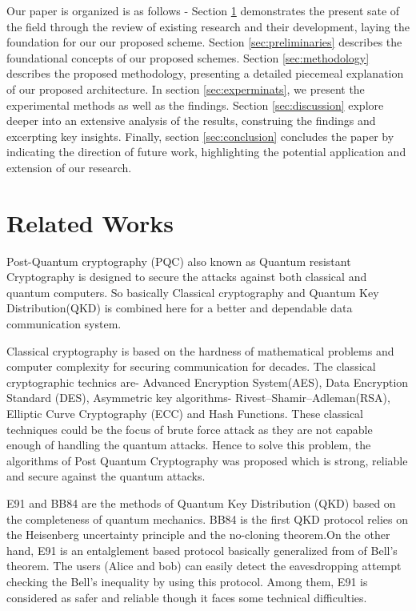 \documentclass{article}
\begin{document}
Our paper is organized is as follows - Section \ref{sec:relatedWorks} demonstrates the present sate of the field through the review of existing research and their development, laying the foundation for our our proposed scheme. Section \ref{sec:preliminaries} describes the foundational concepts of our proposed schemes. Section \ref{sec:methodology} describes the proposed methodology, presenting a detailed piecemeal explanation of our proposed architecture. In section \ref{sec:experminats}, we present the experimental methods as well as the findings. Section \ref{sec:discussion} explore deeper into an extensive analysis of the results, construing the findings and excerpting key insights. Finally, section \ref{sec:conclusion} concludes the paper by indicating the direction of future work, highlighting the potential application and extension of our research.
\section{Related Works}
\label{sec:relatedWorks}
Post-Quantum cryptography (PQC) also known as Quantum resistant Cryptography is designed to secure the attacks against both classical and quantum computers. So basically Classical cryptography and Quantum Key Distribution(QKD) is combined here for a better and dependable data communication system.

Classical cryptography is based on the hardness of mathematical problems and computer complexity for securing communication for decades. The classical cryptographic technics are- Advanced Encryption System(AES), Data Encryption Standard (DES), Asymmetric key algorithms- Rivest–Shamir–Adleman(RSA), Elliptic Curve Cryptography (ECC) and Hash Functions. These classical techniques could be the focus of brute force attack as they are not capable enough of handling the quantum attacks. Hence to solve this problem, the algorithms of Post Quantum Cryptography was proposed which is strong, reliable and secure against the quantum attacks.\cite{sharma2023post}

E91 and BB84 are the methods of Quantum Key Distribution (QKD) based on the completeness of quantum mechanics. BB84 is the first QKD protocol relies on the Heisenberg uncertainty principle and the no-cloning theorem.On the other hand,  E91 is an entalglement based protocol basically generalized from of Bell’s theorem. The users (Alice and bob) can easily detect the eavesdropping attempt checking the Bell’s inequality by using this protocol. \cite{ekert1991quantum} Among them, E91 is considered as safer and reliable though it faces some technical difficulties.\cite{alvarez2016comparison}
\end{document}
